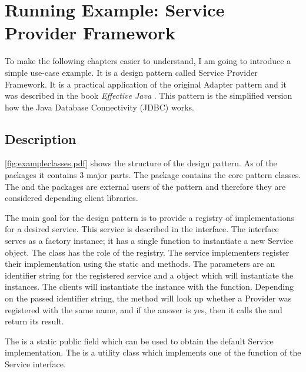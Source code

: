 \section{Running Example: Service Provider Framework}\label{sect:spf}

To make the following chapters easier to understand, I am going to introduce a
simple use-case example. It is a design pattern called Service Provider
Framework. It is a practical application of the original Adapter pattern and it
was described in the book \emph{Effective Java} \cite{Bloch08}. This pattern
is the simplified version how the Java Database Connectivity (JDBC) works.


\subsection{Description}\label{sect:spfdesc}



\autoref{fig:exampleclasses.pdf} shows the structure of the design pattern. As of
the packages it contains 3 major parts.
The  package contains the core pattern classes. The 
and the  packages are external users of the pattern and therefore
they are considered depending client libraries.

The main goal for the design pattern is to provide a registry of implementations
for a desired service. This service is described in the 
interface. The  interface serves as a factory instance; it has
a single function to instantiate a new Service object. The  class
has the role of the registry.
The service implementers register their implementation using the static
 and  methods. The
parameters are an identifier string for the registered service and a 
object which will instantiate the  instances. The clients will
instantiate the  instance with the  function.
Depending on the passed identifier string, the method will look up whether a Provider
was registered with the same name, and if the answer is yes, then it calls the
 and return its result.

The  is a static public field which can be used to
obtain the default Service implementation. The  is a
utility class which implements one of the function of the Service interface.

